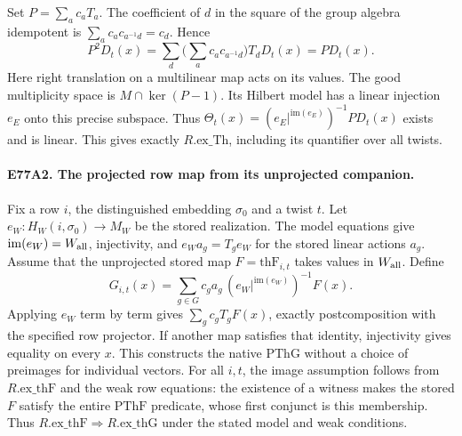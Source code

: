 Set $P=\sum_a c_a T_a$. The coefficient of $d$ in the square of the
group algebra idempotent is $\sum_a c_a c_{a^{-1}d}=c_d$. Hence
\[
 P^2D_t(x)=\sum_d\Big(\sum_a c_a c_{a^{-1}d}\Big)T_d D_t(x)
          =P D_t(x).
\]
Here right translation on a multilinear map acts on its values.
The good multiplicity space is $M\cap\ker(P-1)$. Its Hilbert model
has a linear injection $e_E$ onto this precise subspace. Thus
$\Theta_t(x)=(e_E|^{\mathrm{im}(e_E)})^{-1}P D_t(x)$ exists and
is linear. This gives exactly $R.\mathrm{ex\_Th}$, including its
quantifier over all twists.

\paragraph{E77A2. The projected row map from its unprojected companion.}
Fix a row $i$, the distinguished embedding $\sigma_0$ and a twist $t$.
Let $e_W:H_W(i,\sigma_0)\to M_W$ be the stored realization.
The model equations give $\mathrm{im}(e_W)=W_{\rm all}$, injectivity,
and $e_W a_g=T_g e_W$ for the stored linear actions $a_g$. Assume
that the unprojected stored map $F=\mathrm{thF}_{i,t}$ takes values
in $W_{\rm all}$. Define
\[
 G_{i,t}(x)=\sum_{g\in G}c_g a_g\,
                  (e_W|^{\mathrm{im}(e_W)})^{-1}F(x).
\]
Applying $e_W$ term by term gives $\sum_g c_g T_g F(x)$, exactly
postcomposition with the specified row projector. If another map
satisfies that identity, injectivity gives equality on every $x$.
This constructs the native $\mathrm{PThG}$ without a choice of
preimages for individual vectors. For all $i,t$, the image assumption
follows from $R.\mathrm{ex\_thF}$ and the weak row equations:
the existence of a witness makes the stored $F$ satisfy the entire
$\mathrm{PThF}$ predicate, whose first conjunct is this membership.
Thus $R.\mathrm{ex\_thF}\Rightarrow R.\mathrm{ex\_thG}$ under the
stated model and weak conditions.

